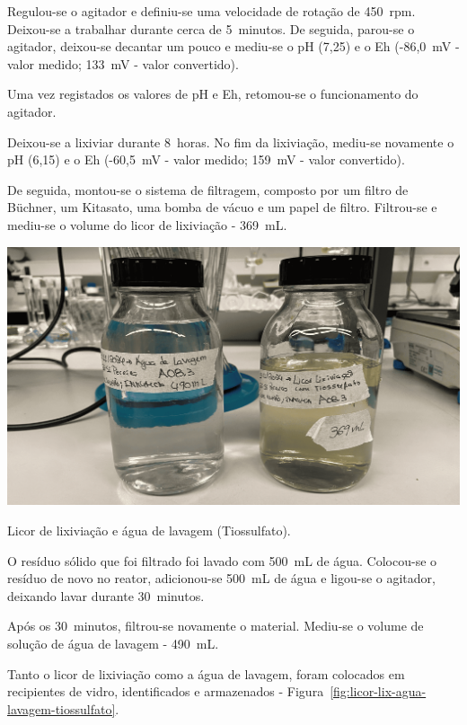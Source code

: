 Regulou-se o agitador e definiu-se uma velocidade de rotação de 450~rpm.
Deixou-se a trabalhar durante cerca de 5~minutos.
De seguida, parou-se o agitador, deixou-se decantar um pouco e mediu-se o pH (7,25) e o Eh (-86,0~mV - valor medido; 133~mV - valor convertido).


Uma vez registados os valores de pH e Eh, retomou-se o funcionamento do agitador.

Deixou-se a lixiviar durante 8~horas.
No fim da lixiviação, mediu-se novamente o pH (6,15) e o Eh (-60,5~mV - valor medido; 159~mV - valor convertido).

De seguida, montou-se o sistema de filtragem, composto por um filtro de Büchner, um Kitasato, uma bomba de vácuo e um papel de filtro.
Filtrou-se e mediu-se o volume do licor de lixiviação - 369~mL\@.

\begin{marginfigure}
    \centering
    \includegraphics[width=0.9\linewidth]{figures/licor e agua lavagem lix tiossulfato}
    \caption{Licor de lixiviação e água de lavagem (Tiossulfato).}
    \label{fig:licor-lix-agua-lavagem-tiossulfato}
\end{marginfigure}

O resíduo sólido que foi filtrado foi lavado com 500~mL de água.
Colocou-se o resíduo de novo no reator, adicionou-se 500~mL de água e ligou-se o agitador, deixando lavar durante 30~minutos.

Após os 30~minutos, filtrou-se novamente o material.
Mediu-se o volume de solução de água de lavagem - 490~mL\@.

Tanto o licor de lixiviação como a água de lavagem, foram colocados em recipientes de vidro, identificados e armazenados - Figura~\ref{fig:licor-lix-agua-lavagem-tiossulfato}.

